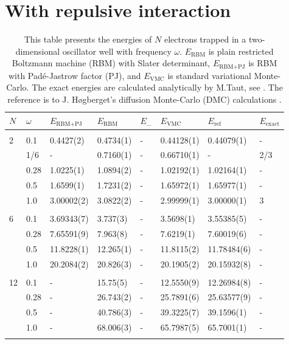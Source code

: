 \section{With repulsive interaction}
\begin{table} [H]
	\caption{This table presents the energies of $N$ electrons trapped in a two-dimensional oscillator well with frequency $\omega$. $E_{\text{RBM}}$ is plain restricted Boltzmann machine (RBM) with Slater determinant, $E_{\text{RBM+PJ}}$ is RBM with Padé-Jastrow factor (PJ), and $E_{\text{VMC}}$ is standard variational Monte-Carlo. The exact energies are calculated analytically by M.Taut, see \cite{taut_two_1994}. The reference is to J. Høgberget's diffusion Monte-Carlo (DMC) calculations \cite{hogberget_quantum_2013}.} 
	\begin{tabularx}{\textwidth}{l:l|XXXXXX} \hline\hline
		\label{tab:quantumdotswinteraction2D}
		$N$ & $\omega$ & $E_{\text{RBM+PJ}}$ & $E_{\text{RBM}}$ & $E_{\text{...}}$ & $E_{\text{VMC}}$ & $E_{\text{ref}} $ & $E_{\text{exact}}$ \\ \hline \\
		2 & 0.1 & 0.4427(2) & 0.4734(1) & - & 0.44128(1) & 0.44079(1) & - \\ 
		& 1/6 & - & 0.7160(1) & - & 0.66710(1) & - & 2/3 \\
		& 0.28 & 1.0225(1) & 1.0894(2) & - & 1.02192(1) & 1.02164(1) & - \\
		& 0.5 & 1.6599(1) & 1.7231(2) & - & 1.65972(1) & 1.65977(1)  & - \\
		& 1.0 & 3.00002(2) & 3.0822(2) & - & 2.99999(1) & 3.00000(1) & 3  \\ \hdashline \\

		6 & 0.1 & 3.69343(7) & 3.737(3) & - & 3.5698(1) & 3.55385(5) & - \\ 
		& 0.28 & 7.65591(9) & 7.963(8) & - & 7.6219(1) & 7.60019(6) & - \\
		& 0.5 & 11.8228(1) & 12.265(1) & - & 11.8115(2) & 11.78484(6) & - \\
		& 1.0 & 20.2084(2) & 20.826(3) & - & 20.1905(2) & 20.15932(8) & - \\ \hdashline \\
		
		12 & 0.1 & - & 15.75(5) & - & 12.5550(9) & 12.26984(8) & -\\ 
		& 0.28 & - & 26.743(2) & - & 25.7891(6) & 25.63577(9) & -\\
		& 0.5 & - & 40.786(3) & - & 39.3225(7) & 39.1596(1) & - \\
		& 1.0 & - & 68.006(3) & - & 65.7987(5) & 65.7001(1) & - \\ \hdashline \\
		

\end{tabularx}
\end{table}
